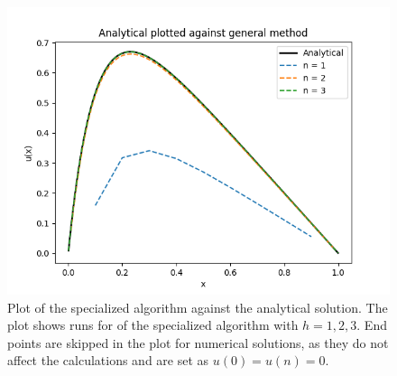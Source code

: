 \documentclass[10pt, a4paper]{amsart}
\begin{document}
\begin{figure}
 \centering
 \includegraphics[width=0.9\linewidth]{../code/plots/plot_general.png}
 \caption{Plot of the specialized algorithm against the analytical solution. The plot shows runs for of the specialized algorithm with $h = 1, 2, 3$. End points are skipped in the plot for numerical solutions, as they do not affect the calculations and are set as $u(0) = u(n) = 0$.}
 \label{fig:general}
\end{figure}
\end{document}
